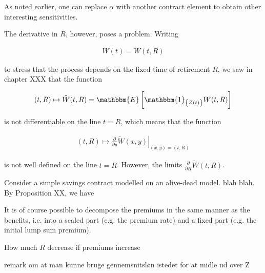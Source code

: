 \documentclass{book}
\newcommand{\1}[1]{\mathbbm{1}_{\left\lbrace #1 \right\rbrace}}
\newcommand{\expec}[1][def]{\mathbbm{E} \left[ #1 \right]}
\theoremstyle{break}
\theoremstyle{remark}
\newenvironment{remark}
  {\pushQED{\qed}\renewcommand{\qedsymbol}{\scalebox{1.4}{$\circ$}}\remarkx}
  {\popQED\endremarkx}
\numberwithin{equation}{section}
\begin{document}
As noted earlier, one can replace $\alpha$ with another contract element to obtain other interesting sensitivities.

The derivative in $R$, however, poses a problem. Writing

\begin{align*}
	W(t) = W(t,R)
\end{align*}

to stress that the process depends on the fixed time of retirement $R$, we saw in chapter XXX that the function

\begin{align*}
	(t,R) \mapsto \tilde{W}(t,R) = \expec[\1{Z(t)}W(t,R)]
\end{align*}

is not differentiable on the line $t=R$, which means that the function

\begin{align*}
	(t,R) \mapsto \left. \frac{\partial}{\partial y} \tilde{W}(x,y) \right|_{(x,y)=(t,R)}
\end{align*}

is not well defined on the line $t=R$. However, the limits $\frac{\partial}{\partial R} \tilde{W}(t,R)$.

\begin{example}
	Consider a simple savings contract modelled on an alive-dead model. blah blah. By Proposition XX, we have
\end{example}

\begin{remark}
It is of course possible to decompose the premiums in the same manner as the benefits, i.e. into a scaled part (e.g. the premium rate) and a fixed part (e.g. the initial lump sum premium).
\end{remark}

\begin{remark}
How much $R$ decrease if premiums increase
\end{remark}

\begin{remark}
	remark om at man kunne bruge gennemsnitsløn istedet for at midle ud over Z
\end{remark}
\end{document}
